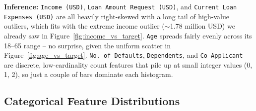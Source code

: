 \documentclass[12pt,a4paper]{article}
\begin{document}
\textbf{Inference:} \texttt{Income (USD)}, \texttt{Loan Amount Request (USD)}, and \texttt{Current Loan Expenses (USD)} are all heavily right-skewed with a long tail of high-value outliers, which fits with the extreme income outlier ($\sim$1.78 million USD) we already saw in Figure~\ref{fig:income_vs_target}. \texttt{Age} spreads fairly evenly across its 18--65 range -- no surprise, given the uniform scatter in Figure~\ref{fig:age_vs_target}. \texttt{No. of Defaults}, \texttt{Dependents}, and \texttt{Co-Applicant} are discrete, low-cardinality count features that pile up at small integer values (0, 1, 2), so just a couple of bars dominate each histogram.

\subsection*{Categorical Feature Distributions}
\end{document}
